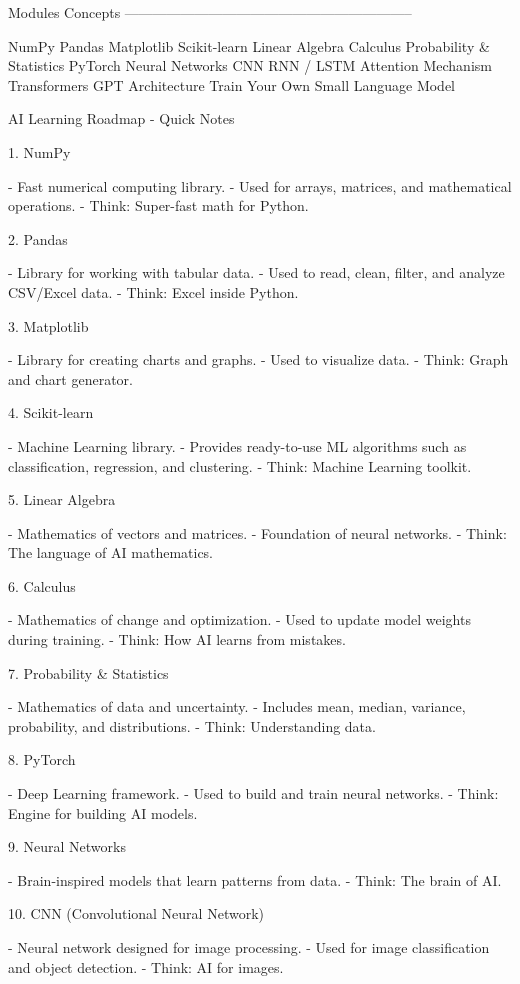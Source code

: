 Modules Concepts --------------------------------------------------------------

NumPy
Pandas
Matplotlib
Scikit-learn
Linear Algebra
Calculus
Probability & Statistics
PyTorch
Neural Networks
CNN
RNN / LSTM
Attention Mechanism
Transformers
GPT Architecture
Train Your Own Small Language Model

AI Learning Roadmap - Quick Notes

1.  NumPy

-   Fast numerical computing library.
-   Used for arrays, matrices, and mathematical operations.
-   Think: Super-fast math for Python.

2.  Pandas

-   Library for working with tabular data.
-   Used to read, clean, filter, and analyze CSV/Excel data.
-   Think: Excel inside Python.

3.  Matplotlib

-   Library for creating charts and graphs.
-   Used to visualize data.
-   Think: Graph and chart generator.

4.  Scikit-learn

-   Machine Learning library.
-   Provides ready-to-use ML algorithms such as classification,
    regression, and clustering.
-   Think: Machine Learning toolkit.

5.  Linear Algebra

-   Mathematics of vectors and matrices.
-   Foundation of neural networks.
-   Think: The language of AI mathematics.

6.  Calculus

-   Mathematics of change and optimization.
-   Used to update model weights during training.
-   Think: How AI learns from mistakes.

7.  Probability & Statistics

-   Mathematics of data and uncertainty.
-   Includes mean, median, variance, probability, and distributions.
-   Think: Understanding data.

8.  PyTorch

-   Deep Learning framework.
-   Used to build and train neural networks.
-   Think: Engine for building AI models.

9.  Neural Networks

-   Brain-inspired models that learn patterns from data.
-   Think: The brain of AI.

10. CNN (Convolutional Neural Network)

-   Neural network designed for image processing.
-   Used for image classification and object detection.
-   Think: AI for images.

